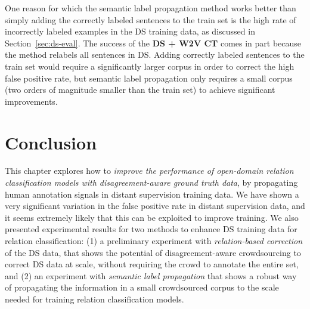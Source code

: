 One reason for which the semantic label propagation method works better than simply adding the correctly labeled sentences to the train set is the high rate of incorrectly labeled examples in the DS training data, as discussed in Section~\ref{sec:ds-eval}. %
The success of the \textbf{DS + W2V CT} comes in part because the method relabels all sentences in DS. Adding correctly labeled sentences to the train set would require a significantly larger corpus in order to correct the high false positive rate, but semantic label propagation only requires a small corpus (two orders of magnitude smaller than the train set) to achieve significant improvements.




\section{Conclusion}

This chapter explores how to \textit{improve the performance of open-domain relation classification models with disagreement-aware ground truth data}, by propagating human annotation signals in distant supervision training data. We have shown a very significant variation in the false positive rate in distant supervision data, and it seems extremely likely that this can be exploited to improve training. We also presented experimental results for two methods to enhance DS training data for relation classification: (1) a preliminary experiment with \textit{relation-based correction} of the DS data, that shows the potential of disagreement-aware crowdsourcing to correct DS data at scale, without requiring the crowd to annotate the entire set, and (2) an experiment with \textit{semantic label propagation} that shows a robust way of propagating the information in a small crowdsourced corpus to the scale needed for training relation classification models.

